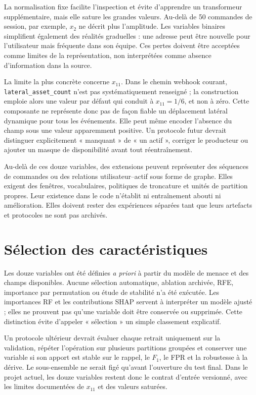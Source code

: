 \documentclass[11pt,a4paper,oneside]{report}
\theoremstyle{definition}
\theoremstyle{plain}
\begin{document}
La normalisation fixe facilite l'inspection et évite d'apprendre un transformeur
supplémentaire, mais elle sature les grandes valeurs. Au-delà de 50 commandes
de session, par exemple, $x_2$ ne décrit plus l'amplitude. Les variables
binaires simplifient également des réalités graduelles : une adresse peut être
nouvelle pour l'utilisateur mais fréquente dans son équipe. Ces pertes doivent
être acceptées comme limites de la représentation, non interprétées comme
absence d'information dans la source.

La limite la plus concrète concerne $x_{11}$. Dans le chemin webhook courant,
\texttt{lateral\_asset\_count} n'est pas systématiquement renseigné ; la
construction emploie alors une valeur par défaut qui conduit à $x_{11}=1/6$,
et non à zéro. Cette composante ne représente donc pas de façon fiable un
déplacement latéral dynamique pour tous les événements. Elle peut même encoder
l'absence du champ sous une valeur apparemment positive. Un protocole futur
devrait distinguer explicitement « manquant » de « un actif », corriger le
producteur ou ajouter un masque de disponibilité avant tout réentraînement.

Au-delà de ces douze variables, des extensions peuvent représenter des
séquences de commandes ou des relations utilisateur--actif sous forme de
graphe. Elles exigent des fenêtres, vocabulaires, politiques de troncature et
unités de partition propres. Leur existence dans le code n'établit ni
entraînement abouti ni amélioration. Elles doivent rester des expériences
séparées tant que leurs artefacts et protocoles ne sont pas archivés.

\section{Sélection des caractéristiques}
\label{sec:data-feature-selection}

Les douze variables ont été définies \emph{a priori} à partir du modèle de
menace et des champs disponibles. Aucune sélection automatique, ablation
archivée, RFE, importance par permutation ou étude de stabilité n'a été
exécutée. Les importances RF et les contributions SHAP servent à interpréter
un modèle ajusté ; elles ne prouvent pas qu'une variable doit être conservée
ou supprimée. Cette distinction évite d'appeler « sélection » un simple
classement explicatif.

Un protocole ultérieur devrait évaluer chaque retrait uniquement sur la
validation, répéter l'opération sur plusieurs partitions groupées et conserver
une variable si son apport est stable sur le rappel, le $F_1$, le FPR et la
robustesse à la dérive. Le sous-ensemble ne serait figé qu'avant l'ouverture
du test final. Dans le projet actuel, les douze variables restent donc le
contrat d'entrée versionné, avec les limites documentées de $x_{11}$ et des
valeurs saturées.
\end{document}
